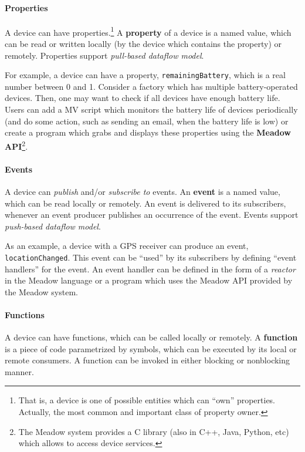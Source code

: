 \documentclass{note}
\begin{document}
\paragraph{Properties}
A device can have properties.\footnote{\textcolor{green2}{That is, a device is
    one of possible entities which can ``own'' properties. Actually, the most
    common and important class of property owner.}} A
  \textcolor{blue2}{\bf{}property} 
of a device is a named value, which can be read or written
locally (by the device which contains the property) or remotely.
Properties support {\em pull-based dataflow model\/}.

For example, a device can have a property,
\textcolor{red2}{\texttt{remainingBattery}}, which is a real number
between 0 and 1. Consider a factory which has multiple battery-operated
devices. Then, one may want to check if all devices have enough battery life. 
Users can add a MV script which monitors the battery life of devices
periodically (and do some action, such as sending an email, when the
battery life is low)  
or create a program which grabs and displays these properties
using the \textcolor{blue2}{\bf{}Meadow API}\footnote{\textcolor{green2}{The
    Meadow system provides a C library (also in C++, Java, Python, etc) which
    allows to access device services.}}.


\paragraph{Events}
A device can {\em publish\/} and/or {\em subscribe to\/} events.
An \textcolor{blue2}{\bf{}event} is a named value, 
which can be read locally or remotely. 
An event is delivered to its subscribers, whenever
an event producer publishes an occurrence of the event.
Events support {\em push-based dataflow model\/}.

As an example, a device with a GPS receiver can produce an event,
\textcolor{red2}{\texttt{locationChanged}}. 
This event can be ``used'' by its subscribers by defining ``event handlers''
for the event. An event handler can be defined in the form of a {\em
  reactor\/} in the Meadow language or a program which uses the Meadow API
provided by the Meadow system.


\paragraph{Functions}
A device can have functions, which can be called locally or remotely.
A \textcolor{blue2}{\bf{}function} is a piece of code parametrized by
symbols, which can be executed by its local or remote consumers.
A function can be invoked in either blocking or nonblocking manner.
\end{document}
